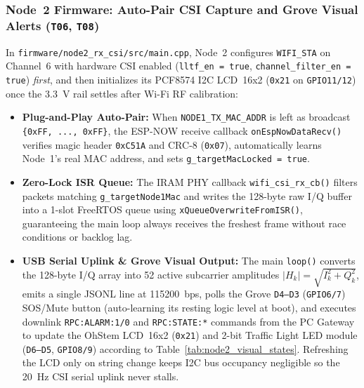 \documentclass{hcmut-report}
\begin{document}
\subsubsection{Node~2 Firmware: Auto-Pair CSI Capture and Grove Visual Alerts (\texttt{T06}, \texttt{T08})}
In \texttt{firmware/node2\_rx\_csi/src/main.cpp}, Node~2 configures \texttt{WIFI\_STA} on Channel~6 with hardware CSI enabled (\texttt{lltf\_en = true}, \texttt{channel\_filter\_en = true}) \emph{first}, and then initializes its PCF8574 I2C LCD~16x2 (\texttt{0x21} on \texttt{GPIO11/12}) once the 3.3~V rail settles after Wi-Fi RF calibration:
\begin{itemize}
  \item \textbf{Plug-and-Play Auto-Pair:} When \texttt{NODE1\_TX\_MAC\_ADDR} is left as broadcast \texttt{\{0xFF, ..., 0xFF\}}, the ESP-NOW receive callback \texttt{onEspNowDataRecv()} verifies magic header \texttt{0xC51A} and CRC-8 (\texttt{0x07}), automatically learns Node~1's real MAC address, and sets \texttt{g\_targetMacLocked = true}.
  \item \textbf{Zero-Lock ISR Queue:} The IRAM PHY callback \texttt{wifi\_csi\_rx\_cb()} filters packets matching \texttt{g\_targetNode1Mac} and writes the 128-byte raw I/Q buffer into a 1-slot FreeRTOS queue using \texttt{xQueueOverwriteFromISR()}, guaranteeing the main loop always receives the freshest frame without race conditions or backlog lag.
  \item \textbf{USB Serial Uplink \& Grove Visual Output:} The main \texttt{loop()} converts the 128-byte I/Q array into 52 active subcarrier amplitudes $|H_k| = \sqrt{I_k^2 + Q_k^2}$, emits a single JSONL line at 115200~bps, polls the Grove \texttt{D4--D3} (\texttt{GPIO6/7}) SOS/Mute button (auto-learning its resting logic level at boot), and executes downlink \texttt{RPC:ALARM:1/0} and \texttt{RPC:STATE:*} commands from the PC Gateway to update the OhStem LCD~16x2 (\texttt{0x21}) and 2-bit Traffic Light LED module (\texttt{D6--D5}, \texttt{GPIO8/9}) according to Table~\ref{tab:node2_visual_states}. Refreshing the LCD only on string change keeps I2C bus occupancy negligible so the 20~Hz CSI serial uplink never stalls.
\end{itemize}
\end{document}
